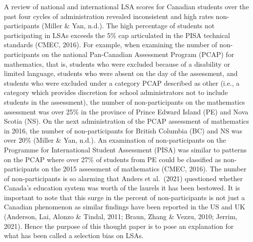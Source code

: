 \documentclass[
]{book}
\begin{document}
A review of national and international LSA scores for Canadian students over the past four cycles of administration revealed inconsistent and high rates non-participants (Miller \& Yan, n.d.). The high percentage of students not participating in LSAs exceeds the 5\% cap articulated in the PISA technical standards (CMEC, 2016). For example, when examining the number of non-participants on the national Pan-Canadian Assessment Program (PCAP) for mathematics, that is, students who were excluded because of a disability or limited language, students who were absent on the day of the assessment, and students who were excluded under a category PCAP described as other (i.e., a category which provides discretion for school administrators not to include students in the assessment), the number of non-participants on the mathematics assessment was over 25\% in the province of Prince Edward Island (PE) and Nova Scotia (NS). On the next administration of the PCAP assessment of mathematics in 2016, the number of non-participants for British Columbia (BC) and NS was over 20\% (Miller \& Yan, n.d.). An examination of non-participants on the Programme for International Student Assessment (PISA) was similar to patterns on the PCAP where over 27\% of students from PE could be classified as non-participants on the 2015 assessment of mathematics (CMEC, 2016). The number of non-participants is so alarming that Anders et al.~(2021) questioned whether Canada's education system was worth of the laurels it has been bestowed. It is important to note that this surge in the percent of non-participants is not just a Canadian phenomenon as similar findings have been reported in the US and UK (Anderson, Lai, Alonzo \& Tindal, 2011; Braun, Zhang \& Vezzu, 2010; Jerrim, 2021). Hence the purpose of this thought paper is to pose an explanation for what has been called a selection bias on LSAs.
\end{document}
